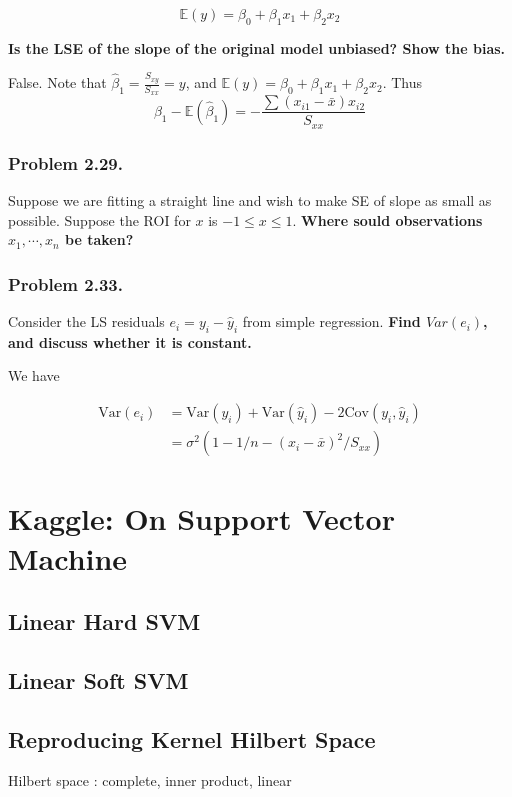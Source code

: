 \documentclass[12pt]{article}
\begin{document}
$$
\mathbb{E}(y) = \beta_0 + \beta_1 x_1 + \beta_2 x_2
$$

\textbf{Is the LSE of the slope of the original model \textbf{unbiased}? Show the bias.}

\bigskip

False. Note that $\hat{\beta}_1 = \frac{S_{xy}}{S_{xx}} = y$, and $\mathbb{E}(y) = \beta_0 + \beta_1 x_1 + \beta_2 x_2$. Thus $$\beta_1 - \mathbb{E} (\hat{\beta}_1 ) = - \frac{\sum (x_{i1} - \bar{x})x_{i2}}{S_{xx}}$$


\subsubsection*{Problem 2.29.} Suppose we are fitting a straight line and wish to make SE of slope as small as possible. Suppose the ROI for $x$ is $-1 \le x \le 1$. \textbf{Where sould observations $x_1, \cdots, x_n$ be taken?}

\bigskip

\subsubsection*{Problem 2.33.} Consider the LS residuals $e_i = y_i - \hat{y}_i$ from simple regression. \textbf{Find $Var(e_i)$, and discuss whether it is constant.}

\bigskip

We have

$$
\begin{aligned}
\mathrm{Var}(e_i) &= \mathrm{Var}(y_i) + \mathrm{Var}(\hat{y}_i) - 2 \mathrm{Cov}(y_i, \hat{y}_i) \\[8pt]
&= \sigma^2 (1 - 1/n - (x_i - \bar{x})^2/S_{xx})
\end{aligned}
$$

\pagebreak

\section*{Kaggle: On Support Vector Machine}

\setcounter{section}{1}
\setcounter{subsection}{0}


\subsection{Linear Hard SVM}


\subsection{Linear Soft SVM}


\subsection{Reproducing Kernel Hilbert Space}

Hilbert space : complete, inner product, linear 
\end{document}
